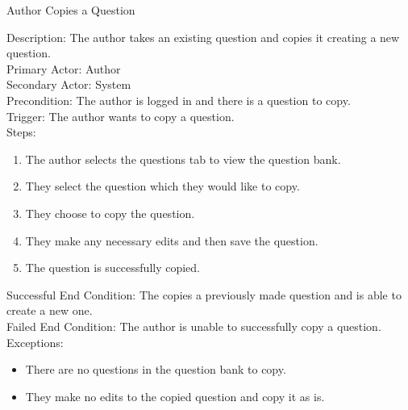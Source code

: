     
    \begin{section}{Author Copies a Question} 
  
Description: The author takes an existing question and copies it creating a new question.\\
Primary Actor: Author\\
Secondary Actor: System\\
Precondition: The author is logged in and there is a question to copy.\\
Trigger: The author wants to copy a question.\\
Steps:
\begin{enumerate}
\item The author selects the questions tab to view the question bank.
\item They select the question which they would like to copy.
\item They choose to copy the question.
\item They make any necessary edits and then save the question.
\item The question is successfully copied.


\end{enumerate}
Successful End Condition: The copies a previously made question and is able to create a new one.\\
Failed End Condition: The author is unable to successfully copy a question.
Exceptions: 
\begin{itemize}
\item There are no questions in the question bank to copy.
\item They make no edits to the copied question and copy it as is.

\end{itemize}


    \end{section}

